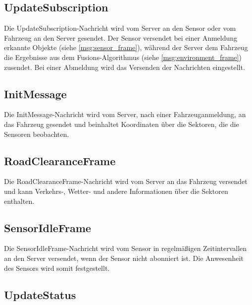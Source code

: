 \subsection{UpdateSubscription}

Die UpdateSubscription-Nachricht wird vom Server an den Sensor oder vom Fahrzeug an den Server gesendet.
Der Sensor versendet bei einer Anmeldung erkannte Objekte (siehe \autoref{msg:sensor_frame}), während der Server dem Fahrzeug die Ergebnisse aus dem Fusions-Algorithmus (siehe \autoref{msg:environment_frame}) zusendet.
Bei einer Abmeldung wird das Versenden der Nachrichten eingestellt.

\subsection{InitMessage}

Die InitMessage-Nachricht wird vom Server, nach einer Fahrzeuganmeldung, an das Fahrzeug gesendet und beinhaltet Koordinaten über die Sektoren, die die Sensoren beobachten.

\subsection{RoadClearanceFrame}

Die RoadClearanceFrame-Nachricht wird vom Server an das Fahrzeug versendet und kann Verkehrs-, Wetter- und andere Informationen über die Sektoren enthalten.

\subsection{SensorIdleFrame}

Die SensorIdleFrame-Nachricht wird vom Sensor in regelmäßigen Zeitintervallen an den Server versendet, wenn der Sensor nicht abonniert ist.
Die Anwesenheit des Sensors wird somit festgestellt.

\subsection{UpdateStatus}



